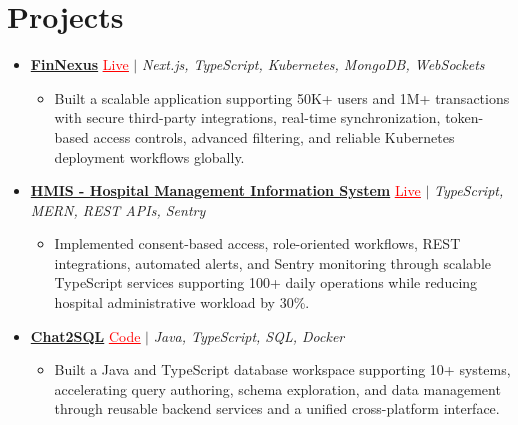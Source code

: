 \documentclass[letterpaper,10pt]{article}
\newcommand{\itemTail}{\vspace{-4pt}}
\newcommand{\projGap}{\vspace{3pt}}
\newcommand{\resumeItem}[1]{\item\small{{#1 \itemTail}}}
\newcommand{\resumeProjectHeading}[1]{\item \small #1 \vspace{-2pt}}
\newcommand{\resumeProjectLink}[2]{\href{#1}{\textcolor{red}{\underline{#2}}}}
\newcommand{\resumeSubHeadingListStart}{\begin{itemize}[leftmargin=0.0in, label={}]}
\newcommand{\resumeSubHeadingListEnd}{\end{itemize}}
\newcommand{\resumeProjItemListStart}{\begin{itemize}[leftmargin=0.15in,label=\textbullet,itemsep=3pt,topsep=0pt,parsep=0pt,partopsep=0pt]}
\newcommand{\resumeProjItemListEnd}{\end{itemize}\vspace{-4pt}}
\begin{document}
\section{Projects}
\resumeSubHeadingListStart
\vspace{-2pt}
\resumeProjectHeading{\href{https://fin-nexus.vercel.app/}{\textbf{FinNexus}} \resumeProjectLink{https://fin-nexus.vercel.app/}{Live} $|$ \emph{Next.js, TypeScript, Kubernetes, MongoDB, WebSockets}}
\resumeProjItemListStart
\resumeItem{Built a scalable application supporting 50K+ users and 1M+ transactions with secure third-party integrations, real-time synchronization, token-based access controls, advanced filtering, and reliable Kubernetes deployment workflows globally.}
\resumeProjItemListEnd
\projGap
\resumeProjectHeading{\href{https://hims-rouge.vercel.app/}{\textbf{HMIS - Hospital Management Information System}} \resumeProjectLink{https://hims-rouge.vercel.app/}{Live} $|$ \emph{TypeScript, MERN, REST APIs, Sentry}}
\resumeProjItemListStart
\resumeItem{Implemented consent-based access, role-oriented workflows, REST integrations, automated alerts, and Sentry monitoring through scalable TypeScript services supporting 100+ daily operations while reducing hospital administrative workload by 30\%.}
\resumeProjItemListEnd
\projGap
\resumeProjectHeading{\href{https://github.com/SAHAJ-BHADJA/Chat2SQL}{\textbf{Chat2SQL}} \resumeProjectLink{https://github.com/SAHAJ-BHADJA/Chat2SQL}{Code} $|$ \emph{Java, TypeScript, SQL, Docker}}
\resumeProjItemListStart
\resumeItem{Built a Java and TypeScript database workspace supporting 10+ systems, accelerating query authoring, schema exploration, and data management through reusable backend services and a unified cross-platform interface.}
\resumeProjItemListEnd
\resumeSubHeadingListEnd
\end{document}
